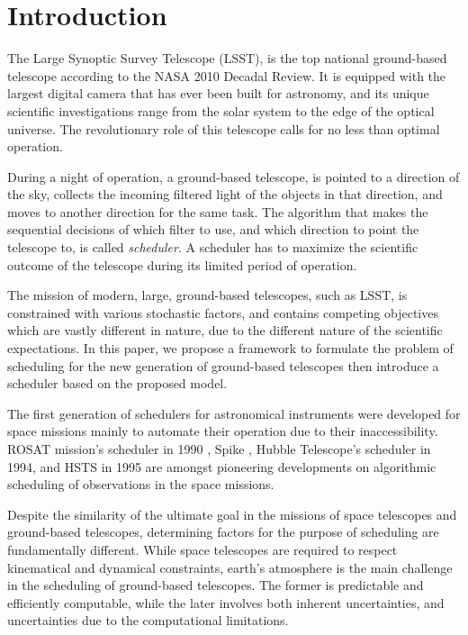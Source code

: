 \documentclass[12pt]{aastex62}
\theoremstyle{definition}
\begin{document}
\section{Introduction}
The Large Synoptic Survey Telescope (LSST), is the top national ground-based telescope according to the NASA 2010 Decadal Review. It is equipped with the largest digital camera that has ever been built for astronomy, and its unique scientific investigations range from the solar system to the edge of the optical universe. The revolutionary role of this telescope calls for no less than optimal operation. 

During a night of operation, a ground-based telescope, is pointed to a direction of the sky, collects the incoming filtered light of the objects in that direction, and moves to another direction for the same task. The algorithm that makes the sequential decisions of which filter to use, and which direction to point the telescope to, is called \textit{scheduler}. A scheduler has to maximize the scientific outcome of the telescope during its limited period of operation. 

The mission of modern, large, ground-based telescopes, such as LSST, is constrained with various stochastic factors, and contains competing objectives which are vastly different in nature, due to the different nature of the scientific expectations. In this paper, we propose a framework to formulate the problem of scheduling for the new generation of ground-based telescopes then introduce a scheduler based on the proposed model.

The first generation of schedulers for astronomical instruments were developed for space missions mainly to automate their operation due to their inaccessibility. ROSAT mission's scheduler in 1990 \citep{nowakovski1999using},  Spike \citep{johnston1994spike}, Hubble Telescope's scheduler in 1994, and HSTS \citep{muscettola1995automating} in 1995 are amongst pioneering developments on algorithmic scheduling of observations in the space missions.

Despite the similarity of the ultimate goal in the missions of space telescopes and ground-based telescopes, determining factors for the purpose of scheduling are fundamentally different. While space telescopes are required to respect kinematical and dynamical constraints, earth's atmosphere is the main challenge in the scheduling of ground-based telescopes. The former is predictable and efficiently computable, while the later involves both inherent uncertainties, and uncertainties due to the computational limitations.
\end{document}
